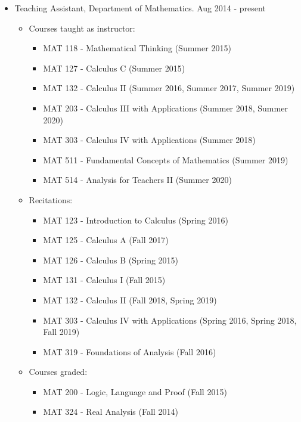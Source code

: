 \documentclass[10pt]{article}
\newenvironment{outerlist}[1][\enskip\textbullet]%
        {\begin{itemize}[#1,leftmargin=*]}{\end{itemize}%
         \vspace{-.6\baselineskip}}
\newenvironment{innerlist}[1][\enskip\textbullet]%
        {\begin{itemize}[#1,leftmargin=*,parsep=0pt,itemsep=0pt,topsep=0pt,partopsep=0pt]}
        {\end{itemize}}
\begin{document}
\begin{outerlist}
\item[] Teaching Assistant, Department of Mathematics. \hfill {Aug 2014 - present}
\begin{innerlist}
                 \item[] Courses taught as instructor:
                 						 \begin{innerlist}		  
                 						 				  \item[] MAT 118 - Mathematical Thinking (Summer 2015)
                 						 				  \item[] MAT 127 - Calculus C (Summer 2015)
                 						 				  \item[] MAT 132 - Calculus II (Summer 2016, Summer 2017, Summer 2019)
                 						 				  \item[] MAT 203 - Calculus III with Applications (Summer 2018, Summer 2020)
                 						 				  \item[] MAT 303 - Calculus IV with Applications (Summer 2018)
                 						 				  \item[] MAT 511 - Fundamental Concepts of Mathematics (Summer 2019)
                 						 				  \item[] MAT 514 - Analysis for Teachers II (Summer 2020)
                 						 \end{innerlist}
                 \item[] Recitations:   
                 						 \begin{innerlist}
                 						 				  \item[] MAT 123 - Introduction to Calculus (Spring 2016)
													      \item[] MAT 125 - Calculus A (Fall 2017)
													      \item[] MAT 126 - Calculus B (Spring 2015)						  
													      \item[] MAT 131 - Calculus I (Fall 2015)
													      \item[] MAT 132 - Calculus II (Fall 2018, Spring 2019)				  
                 						 				  \item[] MAT 303 - Calculus IV with Applications (Spring 2016, Spring 2018, Fall 2019)
                 						 				  \item[] MAT 319 - Foundations of Analysis (Fall 2016)
                 						 \end{innerlist} 
                 \item[] Courses graded:
                                          \begin{innerlist}
                                                            \item[] MAT 200 - Logic, Language and Proof (Fall 2015)                                                         
                                                            \item[] MAT 324 - Real Analysis (Fall 2014)                                                         
                                          \end{innerlist}
                                     
\end{innerlist}
\end{outerlist}     
\end{document}
